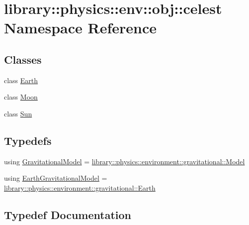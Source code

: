 \hypertarget{namespacelibrary_1_1physics_1_1env_1_1obj_1_1celest}{}\section{library\+:\+:physics\+:\+:env\+:\+:obj\+:\+:celest Namespace Reference}
\label{namespacelibrary_1_1physics_1_1env_1_1obj_1_1celest}
\subsection*{Classes}
\begin{DoxyCompactItemize}
\item 
class \hyperlink{classlibrary_1_1physics_1_1env_1_1obj_1_1celest_1_1_earth}{Earth}
\item 
class \hyperlink{classlibrary_1_1physics_1_1env_1_1obj_1_1celest_1_1_moon}{Moon}
\item 
class \hyperlink{classlibrary_1_1physics_1_1env_1_1obj_1_1celest_1_1_sun}{Sun}
\end{DoxyCompactItemize}
\subsection*{Typedefs}
\begin{DoxyCompactItemize}
\item 
using \hyperlink{namespacelibrary_1_1physics_1_1env_1_1obj_1_1celest_ac63145c8cbe868bd79be8f6f423c8cf4}{Gravitational\+Model} = \hyperlink{classlibrary_1_1physics_1_1environment_1_1gravitational_1_1_model}{library\+::physics\+::environment\+::gravitational\+::\+Model}
\item 
using \hyperlink{namespacelibrary_1_1physics_1_1env_1_1obj_1_1celest_ae5b7a35477a26407f850ec326fb2b2fd}{Earth\+Gravitational\+Model} = \hyperlink{classlibrary_1_1physics_1_1environment_1_1gravitational_1_1_earth}{library\+::physics\+::environment\+::gravitational\+::\+Earth}
\end{DoxyCompactItemize}


\subsection{Typedef Documentation}
\mbox{\label{namespacelibrary_1_1physics_1_1env_1_1obj_1_1celest_ae5b7a35477a26407f850ec326fb2b2fd}} 
